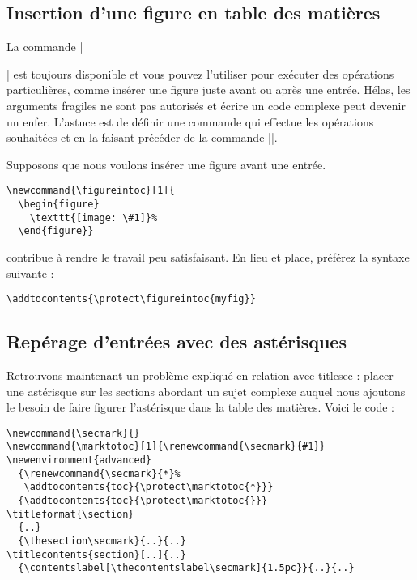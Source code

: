 \documentclass[a4paper]{ltxguide}
\begin{document}
\subsection{Insertion d'une figure en table des matières}

La commande |\addtocontents| est toujours disponible et vous pouvez l'utiliser
pour exécuter des opérations particulières, comme insérer une figure juste
avant ou après une entrée. Hélas, les arguments fragiles ne sont pas autorisés
et écrire un code complexe peut devenir un enfer. L'astuce est de définir 
une commande qui effectue les opérations souhaitées et en la faisant précéder
de la commande |\protect|.

Supposons que nous voulons insérer une figure avant une entrée.
\begin{verbatim}
\newcommand{\figureintoc}[1]{
  \begin{figure}
    \texttt{[image: \#1]}%
  \end{figure}}
\end{verbatim}
contribue à rendre le travail peu satisfaisant. En lieu et place, préférez
la syntaxe suivante :
\begin{verbatim}
\addtocontents{\protect\figureintoc{myfig}}
\end{verbatim}


\subsection{Repérage d'entrées avec des astérisques}

Retrouvons maintenant un problème expliqué en relation avec \textsf{titlesec} : 
placer une astérisque sur les sections abordant un \og sujet complexe \fg{} auquel
nous ajoutons le besoin de faire figurer l'astérisque dans la table des matières. 
Voici le code :
\begin{verbatim}
\newcommand{\secmark}{}
\newcommand{\marktotoc}[1]{\renewcommand{\secmark}{#1}}
\newenvironment{advanced}
  {\renewcommand{\secmark}{*}%
   \addtocontents{toc}{\protect\marktotoc{*}}}
  {\addtocontents{toc}{\protect\marktotoc{}}}
\titleformat{\section}
  {..}
  {\thesection\secmark}{..}{..}
\titlecontents{section}[..]{..}
  {\contentslabel[\thecontentslabel\secmark]{1.5pc}}{..}{..}
\end{verbatim}
\end{document}
